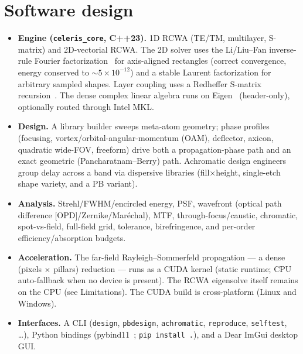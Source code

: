 \documentclass[preprint,12pt]{elsarticle}
\begin{document}
\section{Software design}
\begin{itemize}
\item \textbf{Engine (\texttt{celeris\_core}, C++23).} 1D RCWA (TE/TM, multilayer,
      S-matrix) and 2D-vectorial RCWA. The 2D solver uses the Li/Liu--Fan inverse-rule
      Fourier factorization~\cite{li1996} for axis-aligned rectangles (correct
      convergence, energy conserved to $\sim$$5\times10^{-12}$) and a stable Laurent
      factorization for arbitrary sampled shapes. Layer coupling uses a Redheffer
      S-matrix recursion~\cite{redheffer1962,rumpf2011}. The dense complex linear
      algebra runs on Eigen~\cite{eigen} (header-only), optionally routed through Intel MKL.
\item \textbf{Design.} A library builder sweeps meta-atom geometry; phase profiles
      (focusing, vortex/orbital-angular-momentum (OAM), deflector, axicon,
      quadratic wide-FOV, freeform) drive both
      a propagation-phase path and an exact geometric (Pancharatnam--Berry) path.
      Achromatic design engineers group delay across a band via dispersive libraries
      (fill$\times$height, single-etch shape variety, and a PB variant).
\item \textbf{Analysis.} Strehl/FWHM/encircled energy, PSF, wavefront
      (optical path difference [OPD]/Zernike/Mar\'echal), MTF, through-focus/caustic,
      chromatic, spot-vs-field,
      full-field grid, tolerance, birefringence, and per-order efficiency/absorption
      budgets.
\item \textbf{Acceleration.} The far-field Rayleigh--Sommerfeld propagation --- a dense
      (pixels $\times$ pillars) reduction --- runs as a CUDA kernel (static runtime;
      CPU auto-fallback when no device is present). The RCWA eigensolve itself remains
      on the CPU (see Limitations). The CUDA build is cross-platform (Linux and Windows).
\item \textbf{Interfaces.} A CLI (\texttt{design}, \texttt{pbdesign},
      \texttt{achromatic}, \texttt{reproduce}, \texttt{selftest}, \ldots), Python
      bindings (pybind11~\cite{pybind11}; \texttt{pip install .}), and a Dear ImGui desktop GUI.
\end{itemize}

\end{document}

